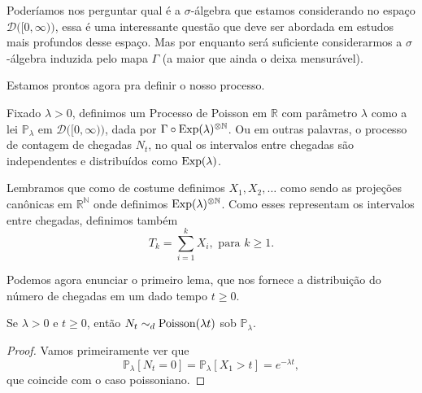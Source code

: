 \begin{topics}
Poderíamos nos perguntar qual é a $\sigma$-álgebra que estamos considerando no espaço $\mathcal{D}\big( [0, \infty) \big)$, essa é uma interessante questão que deve ser abordada em estudos mais profundos desse espaço.
Mas por enquanto será suficiente considerarmos a $\sigma$-álgebra induzida pelo mapa $\Gamma$ (a maior que ainda o deixa mensurável).

Estamos prontos agora pra definir o nosso processo.

\begin{definition}
  Fixado $\lambda > 0$, definimos um Processo de Poisson em $\mathbb{R}$ com parâmetro $\lambda$ como a lei $\mathbb{P}_\lambda$ em $\mathcal{D}\big( [0, \infty) \big)$, dada por $\Gamma \circ \operatorname{Exp}(\lambda)^{\otimes \mathbb{N}}$.
  Ou em outras palavras, o processo de contagem de chegadas $N_t$, no qual os intervalos entre chegadas são independentes e distribuídos como $\operatorname{Exp}(\lambda)$.
\end{definition}

Lembramos que como de costume definimos $X_1, X_2, \dots$ como sendo as projeções canônicas em $\mathbb{R}^\mathbb{N}$ onde definimos $\operatorname{Exp}(\lambda)^{\otimes \mathbb{N}}$.
Como esses representam os intervalos entre chegadas, definimos também
\begin{equation}
  T_k = \sum_{i=1}^k X_i, \text{ para $k \geq 1$}.
\end{equation}

Podemos agora enunciar o primeiro lema, que nos fornece a distribuição do número de chegadas em um dado tempo $t \geq 0$.

\begin{lemma}
  Se $\lambda > 0$ e $t \geq 0$, então $N_t \sim_d \operatorname{Poisson}(\lambda t)$ sob $\mathbb{P}_\lambda$.
\end{lemma}

\begin{proof}
  Vamos primeiramente ver que
  \begin{equation}
    \mathbb{P}_\lambda [N_t = 0] = \mathbb{P}_\lambda[X_1 > t] = e^{-\lambda t},
  \end{equation}
  que coincide com o caso poissoniano.


\end{proof}
\end{topics}
